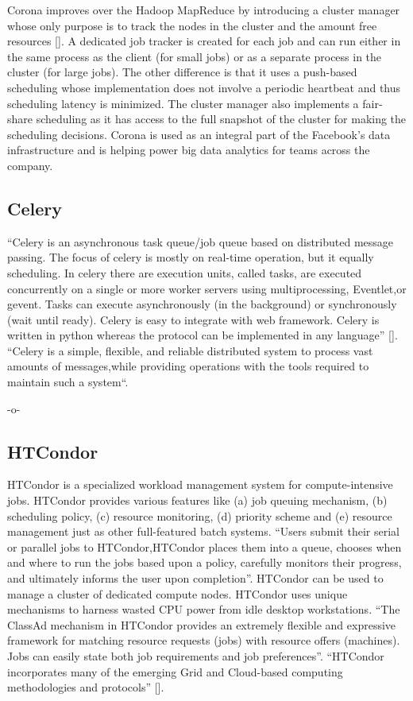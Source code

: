 Corona improves over the Hadoop MapReduce by introducing a cluster
manager whose only purpose is to track the nodes in the cluster and
the amount free resources [\cite{www-facebook-corona}]. A dedicated job
tracker is created for each job and can run either in the same process
as the client (for small jobs) or as a separate process in the cluster
(for large jobs). The other difference is that it uses a push-based
scheduling whose implementation does not involve a periodic heartbeat
and thus scheduling latency is minimized. The cluster manager also
implements a fair-share scheduling as it has access to the full
snapshot of the cluster for making the scheduling decisions. Corona is
used as an integral part of the Facebook's data infrastructure and is
helping power big data analytics for teams across the company.
     
\subsection{Celery}

``Celery is an asynchronous task queue/job queue based on distributed
message passing.  The focus of celery is mostly on real-time
operation, but it equally scheduling.  In celery there are execution
units, called tasks, are executed concurrently on a single or more
worker servers using multiprocessing, Eventlet,or gevent.  Tasks can
execute asynchronously (in the background) or synchronously (wait
until ready).  Celery is easy to integrate with web framework. Celery
is written in python whereas the protocol can be implemented in any
language'' [\cite{celery}]. ``Celery is a simple, flexible, and reliable
distributed system to process vast amounts of messages,while providing
operations with the tools required to maintain such a
system``\cite{celerydocs}.

     -o-

     
\subsection{HTCondor}

    
HTCondor is a specialized workload management system for
compute-intensive jobs.  HTCondor provides various features like (a) job
queuing mechanism, (b) scheduling policy, (c) resource monitoring,
(d) priority scheme and (e) resource management just as other
full-featured batch systems.  ``Users submit their serial or parallel
jobs to HTCondor,HTCondor places them into a queue, chooses when and
where to run the jobs based upon a policy, carefully monitors their
progress, and ultimately informs the user upon completion''.  HTCondor
can be used to manage a cluster of dedicated compute nodes. HTCondor
uses unique mechanisms to harness wasted CPU power from idle desktop
workstations. ``The ClassAd mechanism in HTCondor provides an
extremely flexible and expressive framework for matching resource
requests (jobs) with resource offers (machines).  Jobs can easily
state both job requirements and job preferences''.  ``HTCondor
incorporates many of the emerging Grid and Cloud-based computing
methodologies and protocols'' [\cite{htcondor}].

